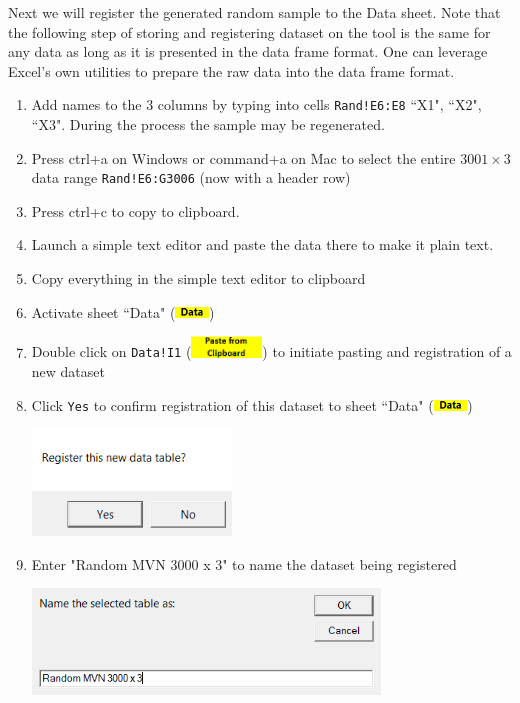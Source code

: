 \documentclass[article]{jss}
\newcommand{\shtData}{``Data" (\includegraphics[height=8pt, keepaspectratio=true]{DataSheetTab_png}) }
\begin{document}
        Next we will register the generated random sample to the Data sheet. Note that the following step of storing and registering dataset on the tool is the same for any data as long as it is presented in the data frame format. One can leverage Excel's own utilities to prepare the raw data into the data frame format.
        \begin{enumerate}
        \item Add names to the 3 columns by typing into cells \texttt{Rand!E6:E8} ``X1", ``X2", ``X3". During the process the sample may be regenerated.
        \item Press ctrl+a on Windows or command+a on Mac to select the entire $3001\times 3$ data range \texttt{Rand!E6:G3006} (now with a header row)
        \item Press ctrl+c to copy to clipboard.
        \item Launch a simple text editor and paste the data there to make it plain text.
        \item Copy everything in the simple text editor to clipboard
        \item Activate sheet \shtData
        \item Double click on \texttt{Data!I1} (\includegraphics[height=16pt,keepaspectratio=true]{DataSheet_PasteFromClipboardButton_png}) to initiate pasting and registration of a new dataset
        \item Click \texttt{Yes} to confirm registration of this dataset to sheet \shtData
        \begin{center}
	        \includegraphics[height=80pt, keepaspectratio=true]{DataSheet_ConfirmRegister_png}
        \end{center}
        \item Enter "Random MVN 3000 x 3" to name the dataset being registered
        \begin{center}
	        \includegraphics[height=80pt, keepaspectratio=true]{DataSheet_GiveDatasetName_png}

\end{center}
\end{enumerate}
\end{document}
